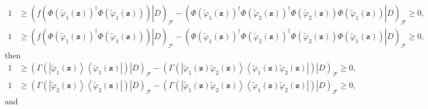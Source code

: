 \documentclass[aps,preprint]{revtex4}%
\begin{document}
\begin{align}
1  &  \geq\left(  \left.  f\left(  \Phi\left(  \tilde{\varphi}_{1}\left(
\mathbf{z}\right)  \right)  ^{\dagger}\Phi\left(  \tilde{\varphi}_{1}\left(
\mathbf{z}\right)  \right)  \right)  \right\vert D\right)  _{\mathcal{F}%
}-\left(  \left.  \Phi\left(  \tilde{\varphi}_{1}\left(  \mathbf{z}\right)
\right)  ^{\dagger}\Phi\left(  \tilde{\varphi}_{2}\left(  \mathbf{z}\right)
\right)  ^{\dagger}\Phi\left(  \tilde{\varphi}_{2}\left(  \mathbf{z}\right)
\right)  \Phi\left(  \tilde{\varphi}_{1}\left(  \mathbf{z}\right)  \right)
\right\vert D\right)  _{\mathcal{F}}\geq0,\nonumber\\
1  &  \geq\left(  \left.  f\left(  \Phi\left(  \tilde{\varphi}_{1}\left(
\mathbf{z}\right)  \right)  ^{\dagger}\Phi\left(  \tilde{\varphi}_{1}\left(
\mathbf{z}\right)  \right)  \right)  \right\vert D\right)  _{\mathcal{F}%
}-\left(  \left.  \Phi\left(  \tilde{\varphi}_{1}\left(  \mathbf{z}\right)
\right)  ^{\dagger}\Phi\left(  \tilde{\varphi}_{2}\left(  \mathbf{z}\right)
\right)  ^{\dagger}\Phi\left(  \tilde{\varphi}_{2}\left(  \mathbf{z}\right)
\right)  \Phi\left(  \tilde{\varphi}_{1}\left(  \mathbf{z}\right)  \right)
\right\vert D\right)  _{\mathcal{F}}\geq0,
\end{align}
then
\begin{align}
1  &  \geq\left(  \left.  \Gamma\left(  \left\vert \tilde{\varphi}_{1}\left(
\mathbf{z}\right)  \right\rangle \left\langle \tilde{\varphi}_{1}\left(
\mathbf{z}\right)  \right\vert \right)  \right\vert D\right)  _{\mathcal{F}%
}-\left(  \left.  \Gamma\left(  \left\vert \tilde{\varphi}_{1}\left(
\mathbf{z}\right)  \tilde{\varphi}_{2}\left(  \mathbf{z}\right)  \right\rangle
\left\langle \tilde{\varphi}_{1}\left(  \mathbf{z}\right)  \tilde{\varphi}%
_{2}\left(  \mathbf{z}\right)  \right\vert \right)  \right\vert D\right)
_{\mathcal{F}}\geq0,\nonumber\\
1  &  \geq\left(  \left.  \Gamma\left(  \left\vert \tilde{\varphi}_{2}\left(
\mathbf{z}\right)  \right\rangle \left\langle \tilde{\varphi}_{2}\left(
\mathbf{z}\right)  \right\vert \right)  \right\vert D\right)  _{\mathcal{F}%
}-\left(  \left.  \Gamma\left(  \left\vert \tilde{\varphi}_{1}\left(
\mathbf{z}\right)  \tilde{\varphi}_{2}\left(  \mathbf{z}\right)  \right\rangle
\left\langle \tilde{\varphi}_{1}\left(  \mathbf{z}\right)  \tilde{\varphi}%
_{2}\left(  \mathbf{z}\right)  \right\vert \right)  \right\vert D\right)
_{\mathcal{F}}\geq0,
\end{align}
and
\end{document}
